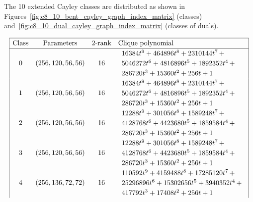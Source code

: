 The 10 extended Cayley classes are distributed
as shown in Figures~\ref{fig:c8_10_bent_cayley_graph_index_matrix} (classes) and~\ref{fig:c8_10_dual_cayley_graph_index_matrix}
(classes of duals).
\begin{table}[!bhpt] %
\small{}
\begin{align*}
\def\arraystretch{1.2}
\begin{array}{|cccl|}
\hline
\text{Class} &
\text{Parameters} &
\text{2-rank} &
\text{Clique polynomial}
\\
\hline
0 &
(256, 120, 56, 56) &
16 &
\begin{array}{l}
16384t^{9} + 464896t^{8} + 2310144t^{7}
\,+
\\
 5046272t^{6} + 4816896t^{5} + 1892352t^{4}
\,+
\\
 286720t^{3} + 15360t^{2} + 256t + 1
\end{array}
\\
1 &
(256, 120, 56, 56) &
16 &
\begin{array}{l}
16384t^{9} + 464896t^{8} + 2310144t^{7}
\,+
\\
 5046272t^{6} + 4816896t^{5} + 1892352t^{4}
\,+
\\
 286720t^{3} + 15360t^{2} + 256t + 1
\end{array}
\\
2 &
(256, 120, 56, 56) &
16 &
\begin{array}{l}
12288t^{9} + 301056t^{8} + 1589248t^{7}
\,+
\\
 4128768t^{6} + 4423680t^{5} + 1859584t^{4}
\,+
\\
 286720t^{3} + 15360t^{2} + 256t + 1
\end{array}
\\
3 &
(256, 120, 56, 56) &
16 &
\begin{array}{l}
12288t^{9} + 301056t^{8} + 1589248t^{7}
\,+
\\
 4128768t^{6} + 4423680t^{5} + 1859584t^{4}
\,+
\\
 286720t^{3} + 15360t^{2} + 256t + 1
\end{array}
\\
4 &
(256, 136, 72, 72) &
16 &
\begin{array}{l}
110592t^{9} + 4159488t^{8} + 17285120t^{7}
\,+
\\
 25296896t^{6} + 15302656t^{5} + 3940352t^{4}
\,+
\\
 417792t^{3} + 17408t^{2} + 256t + 1
\end{array}
\\

\end{array}
\end{align*}
\end{table}
